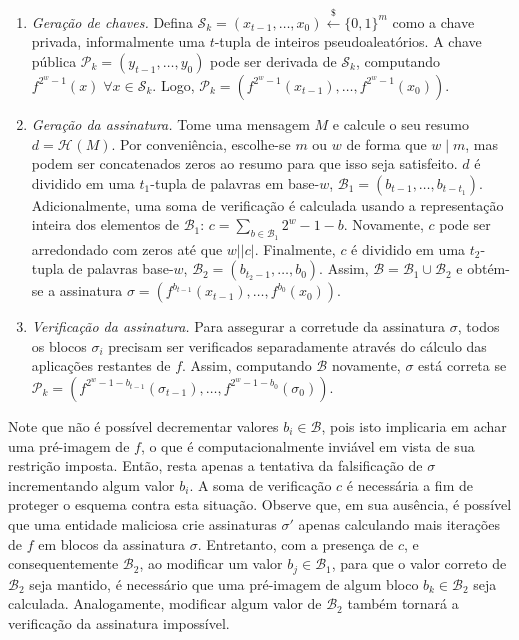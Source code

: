 \documentclass[12pt]{report}
\newcommand{\pk}{\mathcal{P}_k}
\newcommand{\sk}{\mathcal{S}_k}
\newcommand{\hash}[2][]{\mathcal{H}^{#1}(#2)}
\newcommand{\binwds}[1]{\{0, 1\}^{#1}}
\newcommand{\length}[1]{\vert #1 \vert}
\begin{document}
\begin{enumerate}

  \item[] \emph{Geração de chaves.} Defina $\sk{} = (x_{t-1}, \dots, x_0)
      \stackrel{\$}{\longleftarrow} \binwds{m}$ como a chave privada,
        informalmente uma $t$-tupla de inteiros pseudoaleatórios. A chave
        pública $\pk{} = (y_{t-1}, \dots, y_0)$ pode ser derivada de $\sk{}$,
        computando $f^{2^{w}-1}(x) \; \forall x \in  \sk{}$. Logo, $\pk{} =
        (f^{2^{w}-1}(x_{t-1}), \dots, f^{2^{w}-1}(x_0))$.

  \item[] \emph{Geração da assinatura.} Tome uma mensagem $M$ e calcule o seu
      resumo $d = \hash{M}$. Por conveniência, escolhe-se $m$ ou $w$ de forma
        que $w \mid m$, mas podem ser concatenados zeros ao resumo para que
        isso seja satisfeito. $d$ é dividido em uma $t_1$-tupla de palavras em
        base-$w$, $\mathcal{B}_1 = (b_{t-1}, \dots, b_{t-t_1})$.
        Adicionalmente, uma soma de verificação é calculada usando a
        representação inteira dos elementos de $\mathcal{B}_1$: $c = \sum_{b
        \in \mathcal{B}_1} 2^w - 1 - b$. Novamente, $c$ pode ser arredondado
        com zeros até que $w \mid \length{c}$. Finalmente, $c$ é dividido em
        uma $t_2$-tupla de palavras base-$w$, $\mathcal{B}_2 = (b_{t_2-1},
        \dots, b_0)$. Assim, $\mathcal{B} = \mathcal{B}_1 \cup \mathcal{B}_2$ e
        obtém-se a assinatura $\sigma = (f^{b_{t-1}}(x_{t-1}), \dots,
        f^{b_0}(x_0)).$

  \item[] \emph{Verificação da assinatura.} Para assegurar a corretude da
      assinatura $\sigma$, todos os blocos $\sigma_i$ precisam ser verificados
        separadamente através do cálculo das aplicações restantes de $f$.
        Assim, computando $\mathcal{B}$ novamente, $\sigma$ está correta se
        $\pk{} = (f^{2^w - 1 - b_{t-1}}(\sigma_{t-1}), \dots, f^{2^w - 1 -
        b_0}(\sigma_0))$.

\end{enumerate}

Note que não é possível decrementar valores $b_i \in \mathcal{B}$, pois isto
implicaria em achar uma pré-imagem de $f$, o que é computacionalmente inviável
em vista de sua restrição imposta. Então, resta apenas a tentativa da falsificação
de $\sigma$ incrementando algum valor $b_i$. A soma de verificação $c$ é
necessária a fim de proteger o esquema contra esta situação. Observe que,
em sua ausência, é possível que uma entidade maliciosa crie assinaturas
$\sigma'$ apenas calculando mais iterações de $f$ em blocos da assinatura
$\sigma$. Entretanto, com a presença de $c$, e consequentemente
$\mathcal{B}_2$, ao modificar um valor $b_j \in \mathcal{B}_1$, para que o
valor correto de $\mathcal{B}_2$ seja mantido, é necessário que uma pré-imagem
de algum bloco $b_k \in \mathcal{B}_2$ seja calculada. Analogamente, modificar
algum valor de $\mathcal{B}_2$ também tornará a verificação da assinatura
impossível.
\end{document}
